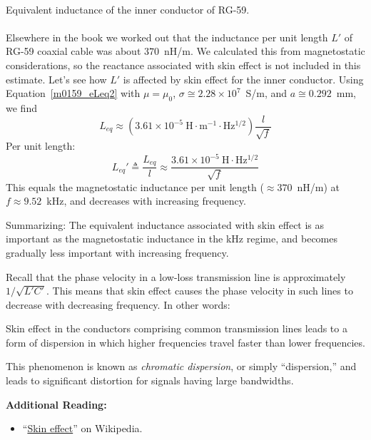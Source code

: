 ~\\ \begin{example} 
\begin{mdframed}[backgroundcolor=brown!20,linecolor=brown!20]\raggedright
Equivalent inductance of the inner conductor of RG-59.
\\~\\
Elsewhere in the book we worked out that the inductance per unit length $L'$ of RG-59 
coaxial cable 
was about $370$~nH/m.
We calculated this from magnetostatic considerations, so the reactance associated with skin effect 
is not included in this estimate.
Let's see how $L'$ is affected by skin effect for the inner conductor.
Using Equation~\ref{m0159_eLeq2} with 
$\mu=\mu_0$, 
$\sigma\cong 2.28 \times 10^7$~S/m, and
$a\cong 0.292$~mm, we find
%
\begin{equation}
L_{eq} \approx \left( 3.61 \times 10^{-5}~\mbox{H$\cdot$m$^{-1}\cdot$Hz$^{1/2}$} \right) \frac{l}{\sqrt{f}} 
\end{equation}
%
Per unit length:
%
\begin{equation}
L_{eq}' \triangleq \frac{L_{eq}}{l} \approx \frac{3.61 \times 10^{-5}~\mbox{H$\cdot$Hz$^{1/2}$}}{\sqrt{f}} 
\end{equation}
%
This equals the magnetostatic inductance per unit length ($\approx 370$~nH/m) at $f \approx 9.52$~kHz, and decreases with increasing frequency.

Summarizing:  The equivalent inductance associated with skin effect is as important as the magnetostatic inductance in the kHz regime, and becomes gradually less important with increasing frequency.
\end{mdframed}
\end{example}

Recall that the phase velocity in a low-loss transmission line is approximately $1/\sqrt{L'C'}$.  
This means that skin effect causes the phase velocity in such lines to decrease with decreasing frequency.
In other words:
%
\begin{mdframed}[backgroundcolor=yellow!20,nobreak=true] 
Skin effect in the conductors comprising common transmission lines leads to a form of dispersion in which higher frequencies travel faster than lower frequencies.
\end{mdframed}
%
This phenomenon is known as \emph{chromatic dispersion}, or simply ``dispersion,'' 
and leads to significant distortion for signals having large bandwidths.


{\bf Additional Reading:}
\begin{itemize}
\item ``\href{https://en.wikipedia.org/wiki/Skin_effect}{Skin effect}'' on Wikipedia.
\end{itemize}



